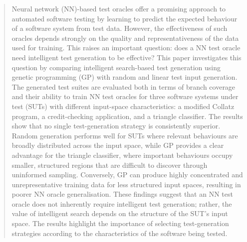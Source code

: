\documentclass[runningheads]{llncs}
\begin{document}
\maketitle
\begin{abstract}
Neural network (NN)-based test oracles offer a promising approach to automated software testing by learning to predict the expected behaviour of a software system from test data. However, the effectiveness of such oracles depends strongly on the quality and representativeness of the data used for training. This raises an important question: does a NN test oracle need intelligent test generation to be effective? This paper investigates this question by comparing intelligent search-based test generation using genetic programming (GP) with random and linear test input generation. The generated test suites are evaluated both in terms of branch coverage and their ability to train NN test oracles for three software systems under test (SUTs) with different input-space characteristics: a modified Collatz program, a credit-checking application, and a triangle classifier. The results show that no single test-generation strategy is consistently superior. Random generation performs well for SUTs where relevant behaviours are broadly distributed across the input space, while GP provides a clear advantage for the triangle classifier, where important behaviours occupy smaller, structured regions that are difficult to discover through uninformed sampling. Conversely, GP can produce highly concentrated and unrepresentative training data for less structured input spaces, resulting in poorer NN oracle generalisation. These findings suggest that an NN test oracle does not inherently require intelligent test generation; rather, the value of intelligent search depends on the structure of the SUT's input space. The results highlight the importance of selecting test-generation strategies according to the characteristics of the software being tested.

\end{abstract}
\end{document}
